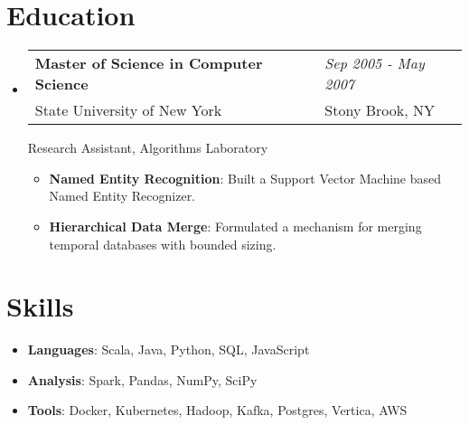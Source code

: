 \documentclass[10pt,twoside,letterpaper]{article}
\newcommand{\resumeItem}[2]{
  \item\small{
    \textbf{#1}{: #2 }
  }
}
\newcommand{\resumeSubHeadingListStart}{\begin{itemize}[leftmargin=*,itemsep=0em]}
\newcommand{\resumeSubHeadingListEnd}{\end{itemize}}
\newcommand{\resumeItemListStart}{
    \begin{minipage}{0.97\textwidth}
        \vspace{0em}\begin{itemize}[itemsep=0pt]
}
\newcommand{\resumeItemListEnd}{
        \end{itemize}
    \end{minipage}
}
\begin{document}
\section{Education}
\resumeSubHeadingListStart
\item {
    \begin{tabularx}{0.97\textwidth}{XR}
      \textbf{Master of Science in Computer Science} & \textit{\small Sep 2005 - May 2007} \\
      State University of New York & Stony Brook, NY  \\
    \end{tabularx}
}
\begin{minipage}{\textwidth}
\vspace{0.25em}
Research Assistant, Algorithms Laboratory
\end{minipage}
    \resumeItemListStart
        \resumeItem{Named Entity Recognition}
          {Built a Support Vector Machine based Named Entity Recognizer.}
          \resumeItem{Hierarchical Data Merge}
          {Formulated a mechanism for merging temporal databases with bounded sizing.}
      \resumeItemListEnd
\resumeSubHeadingListEnd

\section{Skills}
  \resumeSubHeadingListStart
    \item{
      \textbf{Languages}{: Scala, Java, Python, SQL, JavaScript}
         }
    \item {
      \textbf{Analysis}{: Spark, Pandas, NumPy, SciPy}
    }
    \item {
      \textbf{Tools}{: Docker, Kubernetes, Hadoop, Kafka, Postgres, Vertica, AWS}
    }
  \resumeSubHeadingListEnd

\end{document}
